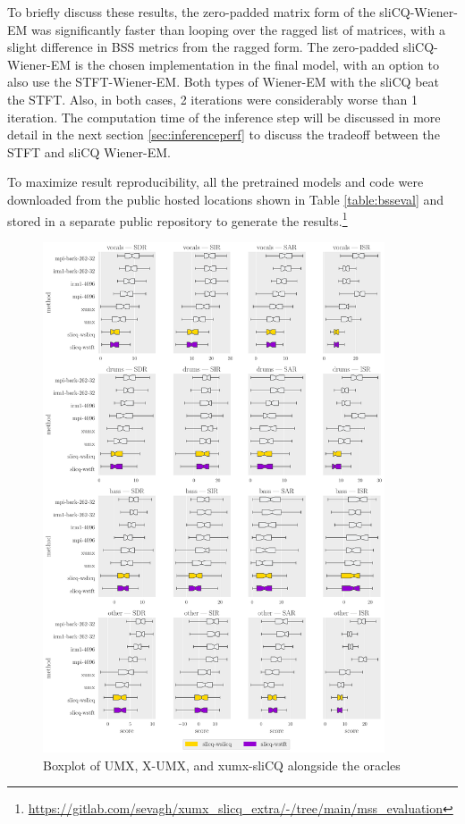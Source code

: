 \documentclass[report.tex]{subfiles}
\begin{document}
To briefly discuss these results, the zero-padded matrix form of the sliCQ-Wiener-EM was significantly faster than looping over the ragged list of matrices, with a slight difference in BSS metrics from the ragged form. The zero-padded sliCQ-Wiener-EM is the chosen implementation in the final model, with an option to also use the STFT-Wiener-EM. Both types of Wiener-EM with the sliCQ beat the STFT. Also, in both cases, 2 iterations were considerably worse than 1 iteration. The computation time of the inference step will be discussed in more detail in the next section \ref{sec:inferenceperf} to discuss the tradeoff between the STFT and sliCQ Wiener-EM.

To maximize result reproducibility, all the pretrained models and code were downloaded from the public hosted locations shown in Table \ref{table:bsseval} and stored in a separate public repository to generate the results.\footnote{\url{https://gitlab.com/sevagh/xumx_slicq_extra/-/tree/main/mss_evaluation}}

\begin{figure}[ht]
	\centering
	\includegraphics[width=0.9\textwidth]{./images-bss/boxplot_full.pdf}
	\caption{Boxplot of UMX, X-UMX, and xumx-sliCQ alongside the oracles}
	\label{fig:bssboxplot}
\end{figure}
\end{document}
